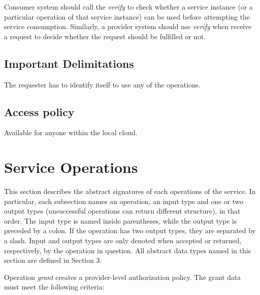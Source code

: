 \documentclass[a4paper]{arrowhead}
\begin{document}
Consumer system should call the \textit{verify} to check whether a service instance (or a particular operation of that service instance) can be used before attempting the service consumption. Similarly, a provider system should use \textit{verify} when receive a request to decide whether the request should be fulfilled or not.

\subsection{Important Delimitations}
\label{sec:delimitations}

The requester has to identify itself to use any of the operations.

\subsection{Access policy}
\label{sec:accesspolicy}

Available for anyone within the local cloud.

\newpage

\section{Service Operations}
\label{sec:functions}

This section describes the abstract signatures of each operations of the service. In particular, each subsection names an operation, an input type and one or two output types (unsuccessful operations can return different structure), in that order.
The input type is named inside parentheses, while the output type is preceded by a colon. If the operation has two output types, they are separated by a slash.
Input and output types are only denoted when accepted or returned, respectively, by the operation in question. All abstract data types named in this section are defined in Section 3.

{}

Operation \textit{grant} creates a provider-level authorization policy. The grant data must meet the following criteria:
\end{document}
